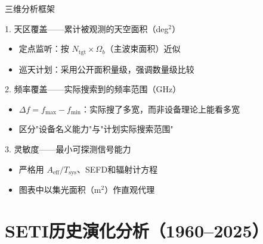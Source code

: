 \documentclass{sysupptthesis}
\begin{document}
\begin{frame}{三维分析框架}
    \begin{block}{1. 天区覆盖——累计被观测的天空面积（deg$^2$）}
        \begin{itemize}
            \item 定点监听：按 $N_{\text{tgt}} \times \Omega_b$（主波束面积）近似
            \item 巡天计划：采用公开面积量级，强调数量级比较
        \end{itemize}
    \end{block}

    \begin{block}{2. 频率覆盖——实际搜索到的频率范围（GHz）}
        \begin{itemize}
            \item $\Delta f = f_{\max} - f_{\min}$：实际搜了多宽，而非设备理论上能看多宽
            \item 区分"设备名义能力"与"计划实际搜索范围"
        \end{itemize}
    \end{block}

    \begin{block}{3. 灵敏度——最小可探测信号能力}
        \begin{itemize}
            \item 严格用 $A_{\text{eff}}/T_{\text{sys}}$、SEFD和辐射计方程
            \item 图表中以集光面积（m$^2$）作直观代理
        \end{itemize}
    \end{block}
\end{frame}

\section{SETI历史演化分析（1960--2025）}
\end{document}
